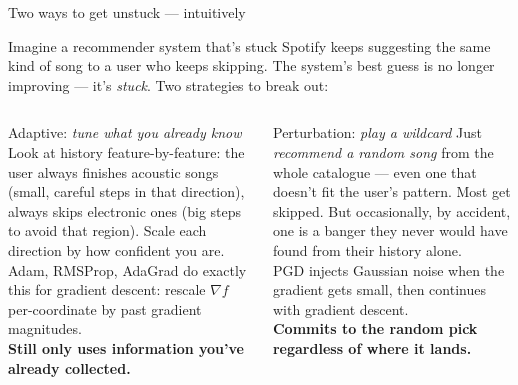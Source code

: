 \documentclass[11pt,aspectratio=169]{beamer}
\newcommand{\warn}[1]{\textcolor{slateaccent}{\textbf{#1}}}
\begin{document}
\begin{frame}{Two ways to get unstuck --- intuitively}
  \begin{block}{Imagine a recommender system that's stuck}
    Spotify keeps suggesting the same kind of song to a user who keeps
    skipping. The system's best guess is no longer improving --- it's
    \emph{stuck}. Two strategies to break out:
  \end{block}
  \vspace{0.3em}
  \begin{columns}[T,onlytextwidth]
      \begin{block}{Adaptive: \emph{tune what you already know}}
        \footnotesize
        Look at history feature-by-feature: the user always finishes
        acoustic songs (small, careful steps in that direction), always
        skips electronic ones (big steps to avoid that region). Scale
        each direction by how confident you are.
        \\[0.4em]
        \alert{Adam, RMSProp, AdaGrad} do exactly this for gradient
        descent: rescale $\nabla f$ per-coordinate by past gradient
        magnitudes.\\[0.3em]
        \warn{Still only uses information you've already collected.}
      \end{block}
      \begin{block}{Perturbation: \emph{play a wildcard}}
        \footnotesize
        Just \emph{recommend a random song} from the whole catalogue ---
        even one that doesn't fit the user's pattern. Most get skipped.
        But occasionally, by accident, one is a banger they never would
        have found from their history alone.
        \\[0.4em]
        \alert{PGD} \scriptsize{\citep{jin2017escape}} \footnotesize injects
        Gaussian noise when the gradient gets small, then continues
        with gradient descent.
        \\[0.3em]
        \warn{Commits to the random pick regardless of where it lands.}
      \end{block}
  \end{columns}
\end{frame}
\end{document}
